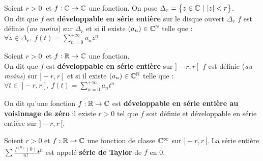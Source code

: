 \vspace{1.2cm}

Soient \(r>0\ \) et \(f:\mathbb{C} \to \mathbb{C}\) une fonction. On pose \(\Delta_r=\bigl\{ z\in \CC \ \rvert \ |z|<r \bigr\}\).\vspace{0.1cm}\\
On dit que \(f\) est \textbf{développable en série entière} sur le disque ouvert \(\Delta_r\) \ssi \(f\) est\vspace{0.1cm}\\
définie (\emph{au moins}) sur \(\Delta_r\) et si il existe \((a_n)\in \mathbb{C}^{\mathbb{N}}\) telle que : \(\displaystyle \forall z\in \Delta_r,\ f(t)=\sum_{n=0}^{+\infty}a_nz^n\)

\vspace{1cm}

Soient \(r>0\ \) et \(f:\mathbb{R} \to \mathbb{C}\) une fonction.\vspace{0.1cm}\\
On dit que \(f\) est \textbf{développable en série entière} sur \(]-r,r\,[\ \) \ssi \(f\) est définie (\emph{au moins}) sur \(]-r,r\,[\ \) et si il existe \((a_n)\in \mathbb{C}^{\mathbb{N}}\) telle que : \(\displaystyle \forall t\in \ ]-r,r\, [\, ,\ f(t)=\sum_{n=0}^{+\infty}a_nt^n\)

\vspace{1cm}

On dit qu'une fonction \(f:\mathbb{R} \to \mathbb{C}\) est \textbf{développable en série entière au voisinnage de zéro} \ssi il existe \(r>0\) tel que \(f\) soit définie et développable en série entière sur \(]-r,r\, [\).

\vspace{1cm}

\noindent Soient \(r>0\) et \(f:\mathbb{R} \to \mathbb{C}\) une fonction de classe \(\mathbb{C} ^\infty\) sur \(]-r,r\, [\). La série entière \(\displaystyle \sum \frac{f^{(n)}(0)}{n!}t^n\) est appelé \textbf{série de Taylor} de \(f\) en 0.

\vspace{2.4cm}
